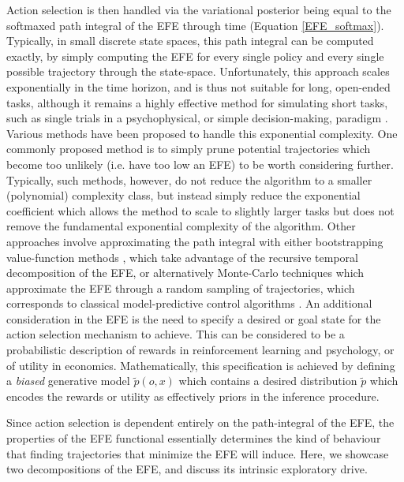 Action selection is then handled via the variational posterior being equal to the softmaxed path integral of the EFE through time (Equation \ref{EFE_softmax}). Typically, in small discrete state spaces, this path integral can be computed exactly, by simply computing the EFE for every single policy and every single possible trajectory through the state-space. Unfortunately, this approach scales exponentially in the time horizon, and is thus not suitable for long, open-ended tasks, although it remains a highly effective method for simulating short tasks, such as single trials in a psychophysical, or simple decision-making, paradigm \citep{friston_active_2015,schwartenbeck2015optimal,friston2020sophisticated}. Various methods have been proposed to handle this exponential complexity. One commonly proposed method is to simply prune potential trajectories which become too unlikely (i.e. have too low an EFE) to be worth considering further. Typically, such methods, however, do not reduce the algorithm to a smaller (polynomial) complexity class, but instead simply reduce the exponential coefficient which allows the method to scale to slightly larger tasks but does not remove the fundamental exponential complexity of the algorithm. Other approaches involve approximating the path integral with either bootstrapping value-function methods \citep{millidge_deep_2019}, which take advantage of the recursive temporal decomposition of the EFE, or alternatively Monte-Carlo techniques which approximate the EFE through a random sampling of trajectories, which corresponds to classical model-predictive control algorithms \citep{kappen2012optimal}. An additional consideration in the EFE is the need to specify a desired or goal state for the action selection mechanism to achieve. This can be considered to be a probabilistic description of rewards in reinforcement learning and psychology, or of utility in economics. Mathematically, this specification is achieved by defining a \emph{biased} generative model $\tilde{p}(o,x)$ which contains a desired distribution $\tilde{p}$ which encodes the rewards or utility as effectively priors in the inference procedure.

Since action selection is dependent entirely on the path-integral of the EFE, the properties of the EFE functional essentially determines the kind of behaviour that finding trajectories that minimize the EFE will induce. Here, we showcase two decompositions of the EFE, and discuss its intrinsic exploratory drive.

